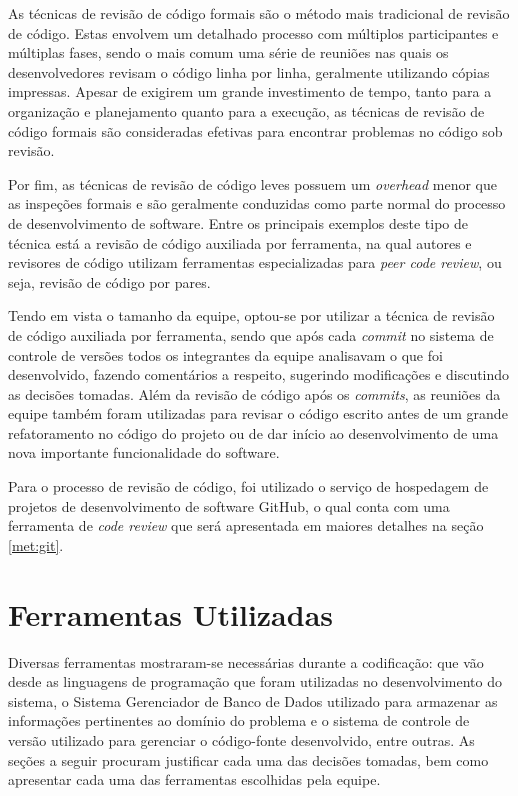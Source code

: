 As técnicas de revisão de código formais são o método mais tradicional de revisão de código.
Estas envolvem um detalhado processo com múltiplos participantes e múltiplas fases, sendo o mais comum uma série de reuniões nas quais os desenvolvedores revisam o código linha por linha, geralmente utilizando cópias impressas.
Apesar de exigirem um grande investimento de tempo, tanto para a organização e planejamento quanto para a execução, as técnicas de revisão de código formais são consideradas efetivas para encontrar problemas no código sob revisão.

Por fim, as técnicas de revisão de código leves possuem um \emph{overhead} menor que as inspeções formais e são geralmente conduzidas como parte normal do processo de desenvolvimento de software.
Entre os principais exemplos deste tipo de técnica está a revisão de código auxiliada por ferramenta, na qual autores e revisores de código utilizam ferramentas especializadas para \emph{peer code review}, ou seja, revisão de código por pares.

Tendo em vista o tamanho da equipe, optou-se por utilizar a técnica de revisão de código auxiliada por ferramenta, sendo que após cada \emph{commit} no sistema de controle de versões todos os integrantes da equipe analisavam o que foi desenvolvido, fazendo comentários a respeito, sugerindo modificações e discutindo as decisões tomadas.
Além da revisão de código após os \emph{commits}, as reuniões da equipe também foram utilizadas para revisar o código escrito antes de um grande refatoramento no código do projeto ou de dar início ao desenvolvimento de uma nova importante funcionalidade do software.

Para o processo de revisão de código, foi utilizado o serviço de hospedagem de projetos de desenvolvimento de software GitHub, o qual conta com uma ferramenta de \emph{code review} que será apresentada em maiores detalhes na seção \ref{met:git}.


\section{Ferramentas Utilizadas}

Diversas ferramentas mostraram-se necessárias durante a codificação: que vão desde as linguagens de programação que foram utilizadas no desenvolvimento do sistema, o Sistema Gerenciador de Banco de Dados utilizado para armazenar as informações pertinentes ao domínio do problema e o sistema de controle de versão utilizado para gerenciar o código-fonte desenvolvido, entre outras.
As seções a seguir procuram justificar cada uma das decisões tomadas, bem como apresentar cada uma das ferramentas escolhidas pela equipe.

